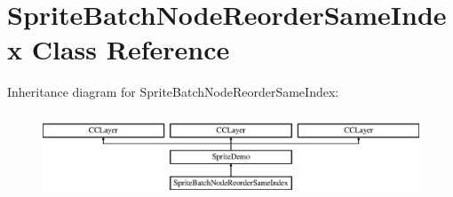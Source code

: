 \hypertarget{interface_sprite_batch_node_reorder_same_index}{\section{Sprite\-Batch\-Node\-Reorder\-Same\-Index Class Reference}
\label{interface_sprite_batch_node_reorder_same_index}
}
Inheritance diagram for Sprite\-Batch\-Node\-Reorder\-Same\-Index\-:\begin{figure}[H]
\begin{center}
\leavevmode
\includegraphics[height=2.522523cm]{interface_sprite_batch_node_reorder_same_index}
\end{center}
\end{figure}
